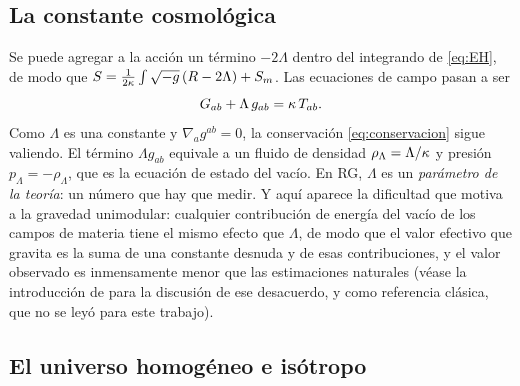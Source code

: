 \subsection{La constante cosmológica}

Se puede agregar a la acción un término $-2\Lambda$ dentro del integrando de \eqref{eq:EH}, de modo que $S=\frac{1}{2\kappa}\int\sqrt{-g}\,(R-2\Lambda)+S_m$. Las ecuaciones de campo pasan a ser
\begin{equation}
G_{ab}+\Lambda\,g_{ab}=\kappa\,T_{ab}.
\label{eq:EinsteinLambda}
\end{equation}
Como $\Lambda$ es una constante y $\nabla_a g^{ab}=0$, la conservación \eqref{eq:conservacion} sigue valiendo. El término $\Lambda g_{ab}$ equivale a un fluido de densidad $\rho_\Lambda=\Lambda/\kappa$ y presión $p_\Lambda=-\rho_\Lambda$, que es la ecuación de estado del vacío. En RG, $\Lambda$ es un \emph{parámetro de la teoría}: un número que hay que medir. Y aquí aparece la dificultad que motiva a la gravedad unimodular: cualquier contribución de energía del vacío de los campos de materia tiene el mismo efecto que $\Lambda$, de modo que el valor efectivo que gravita es la suma de una constante desnuda y de esas contribuciones, y el valor observado es inmensamente menor que las estimaciones naturales (véase la introducción de \cite{leon22} para la discusión de ese desacuerdo, y \cite{weinberg89} como referencia clásica, que no se leyó para este trabajo).

\subsection{El universo homogéneo e isótropo}

